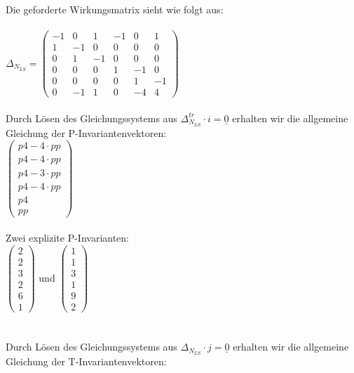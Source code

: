 \documentclass[a4paper,12pt]{scrartcl}
\begin{document}
\subsubsection{}
Die geforderte Wirkungsmatrix sieht wie folgt aus:\\\\
$
\Delta_{N_{LS}} = 
\begin{pmatrix}
-1 & 0 & 1 & -1 & 0 & 1\\
1 & -1 & 0 & 0 & 0 & 0\\
0 & 1 & -1 & 0 & 0 & 0\\
0 & 0 & 0 & 1 & -1 & 0\\
0 & 0 & 0 & 0 & 1 & -1\\
0 & -1 & 1 & 0 & -4 & 4
\end{pmatrix}
$\\\\
Durch Lösen des Gleichungssystems aus $\Delta_{N_{LS}}^{tr} \cdot i = \underline{0}$ erhalten wir die allgemeine Gleichung der P-Invariantenvektoren:\\
$
\begin{pmatrix}
p4-4 \cdot pp\\
p4-4 \cdot pp\\
p4-3 \cdot pp\\
p4-4 \cdot pp\\
p4\\
pp
\end{pmatrix}
$\\\\
Zwei explizite P-Invarianten:\\
$
\begin{pmatrix}
2\\
2\\
3\\
2\\
6\\
1
\end{pmatrix}
$
und
$
\begin{pmatrix}
1\\
1\\
3\\
1\\
9\\
2
\end{pmatrix}
$\\\\\\
Durch Lösen des Gleichungssystems aus $\Delta_{N_{LS}} \cdot j = \underline{0}$ erhalten wir die allgemeine Gleichung der T-Invariantenvektoren:\\
\end{document}
